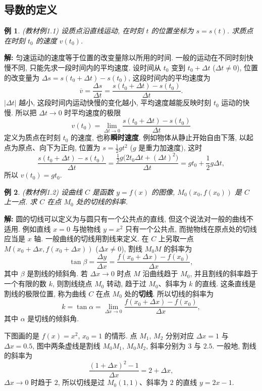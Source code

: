 \documentclass[UTF8,openany]{ctexbook}
\theoremstyle{chinesetextbook}
\newtheorem{example}{例}[section]
\newenvironment{cnsolution}{\par\indent\textbf{解:} \ignorespaces}{\par}
\begin{document}
\subsection{导数的定义}
\begin{example}\label{ex:c2-1-1}
\textnormal{(教材例1.1)} 设质点沿直线运动, 在时刻 $t$ 的位置坐标为 $s=s(t)$. 求质点在时刻 $t_0$ 的速度 $v(t_0)$.
\end{example}
\begin{cnsolution}
匀速运动的速度等于位置的改变量除以所用的时间. 一般的运动在不同时刻快慢不同, 只能先求一段时间内的平均速度. 设时间从 $t_0$ 变到 $t_0+\Delta t$ ($\Delta t\ne0$), 位置的改变量为 $\Delta s=s(t_0+\Delta t)-s(t_0)$, 这段时间内的平均速度为
\[
\overline v=\frac{\Delta s}{\Delta t}=\frac{s(t_0+\Delta t)-s(t_0)}{\Delta t}.
\]
$|\Delta t|$ 越小, 这段时间内运动快慢的变化越小, 平均速度越能反映时刻 $t_0$ 运动的快慢. 所以把 $\Delta t\to0$ 时平均速度的极限
\[
v(t_0)=\lim_{\Delta t\to0}\frac{s(t_0+\Delta t)-s(t_0)}{\Delta t}
\]
定义为质点在时刻 $t_0$ 的速度, 也称\textbf{瞬时速度}. 例如物体从静止开始自由下落, 以起点为原点、向下为正向, 位置为 $\displaystyle s=\frac12gt^2$ ($g$ 是重力加速度), 这时
\[
\frac{s(t_0+\Delta t)-s(t_0)}{\Delta t}=\frac{\frac12g\bigl(2t_0\Delta t+(\Delta t)^2\bigr)}{\Delta t}=gt_0+\frac12g\Delta t,
\]
所以 $v(t_0)=gt_0$.
\end{cnsolution}
\begin{example}\label{ex:c2-1-2}
\textnormal{(教材例1.2)} 设曲线 $C$ 是函数 $y=f(x)$ 的图像, $M_0(x_0,f(x_0))$ 是 $C$ 上一点. 求 $C$ 在点 $M_0$ 处的切线的斜率.
\end{example}
\begin{cnsolution}
圆的切线可以定义为与圆只有一个公共点的直线, 但这个说法对一般的曲线不适用. 例如直线 $x=0$ 与抛物线 $y=x^2$ 只有一个公共点, 而抛物线在原点处的切线应当是 $x$ 轴. 一般曲线的切线用割线来定义. 在 $C$ 上另取一点 $M(x_0+\Delta x,f(x_0+\Delta x))$ ($\Delta x\ne0$), 割线 $M_0M$ 的斜率为
\[
\tan\beta=\frac{\Delta y}{\Delta x}=\frac{f(x_0+\Delta x)-f(x_0)}{\Delta x},
\]
其中 $\beta$ 是割线的倾斜角. 若 $\Delta x\to0$ 时点 $M$ 沿曲线趋于 $M_0$, 并且割线的斜率趋于一个有限的数 $k$, 则割线绕点 $M_0$ 转动, 趋于过 $M_0$、斜率为 $k$ 的直线. 这条直线是割线的极限位置, 称为曲线 $C$ 在点 $M_0$ 处的\textbf{切线}. 所以切线的斜率为
\[
k=\tan\alpha=\lim_{\Delta x\to0}\frac{f(x_0+\Delta x)-f(x_0)}{\Delta x},
\]
其中 $\alpha$ 是切线的倾斜角.

下图画的是 $f(x)=x^2$, $x_0=1$ 的情形. 点 $M_1$, $M_2$ 分别对应 $\Delta x=1$ 与 $\Delta x=0.5$, 图中两条虚线是割线 $M_0M_1$, $M_0M_2$, 斜率分别为 $3$ 与 $2.5$. 一般地, 割线的斜率为
\[
\frac{(1+\Delta x)^2-1}{\Delta x}=2+\Delta x,
\]
$\Delta x\to0$ 时趋于 $2$, 所以切线是过 $M_0(1,1)$、斜率为 $2$ 的直线 $y=2x-1$.
\end{cnsolution}
\end{document}
